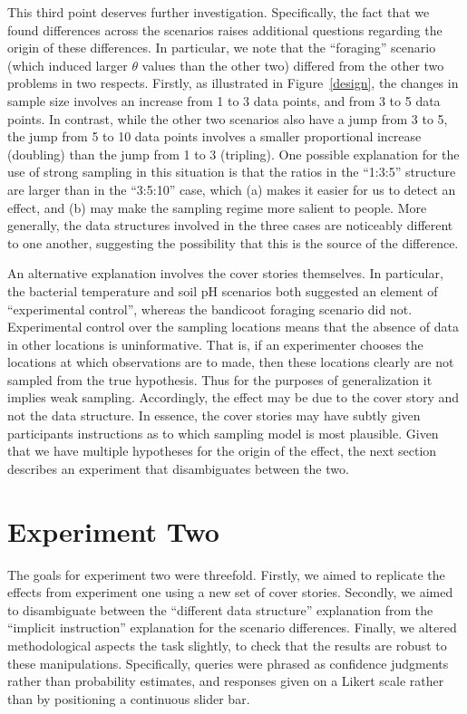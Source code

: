 \documentclass[doc]{apa6}
\begin{document}
This third point deserves further investigation. Specifically, the fact that we found differences across the scenarios raises additional questions regarding the origin of these differences. In particular, we note that the ``foraging'' scenario (which induced larger $\theta$ values than the other two) differed from the other two problems in two respects. Firstly, as illustrated in Figure~\ref{design}, the changes in sample size involves an increase from 1 to 3 data points, and from 3 to 5 data points. In contrast, while the other two scenarios also have a jump from 3 to 5, the jump from 5 to 10 data points involves a smaller proportional increase (doubling) than the jump from 1 to 3 (tripling). One possible explanation for the use of strong sampling in this situation is that the ratios in the ``1:3:5'' structure are larger than in the ``3:5:10'' case, which (a) makes it easier for us to detect an effect, and (b) may make the sampling regime more salient to people. More generally, the data structures involved in the three cases are noticeably different to one another, suggesting the possibility that this is the source of the difference.

An alternative explanation involves the cover stories themselves. In particular, the bacterial temperature and soil pH scenarios both suggested an element of ``experimental control'', whereas the bandicoot foraging scenario did not. Experimental control over the sampling locations means that the absence of data in other locations is uninformative. That is, if an experimenter chooses the locations at which observations are to made, then these locations clearly are not sampled from the true hypothesis. Thus for the purposes of generalization it implies weak sampling. Accordingly, the effect may be due to the cover story and not the data structure. In essence, the cover stories may have subtly given participants instructions as to which sampling model is most plausible. Given that we have multiple hypotheses for the origin of the effect, the next section describes an experiment that disambiguates between the two.


\section{Experiment Two}

The goals for experiment two were threefold. Firstly, we aimed to replicate the effects from experiment one using a new set of cover stories. Secondly, we aimed to disambiguate between the ``different data structure'' explanation from the ``implicit instruction'' explanation for the scenario differences. Finally, we altered methodological aspects the task slightly, to check that the results are robust to these manipulations. Specifically, queries were phrased as confidence judgments rather than probability estimates, and responses given on a Likert scale rather than by positioning a continuous slider bar.
\end{document}
